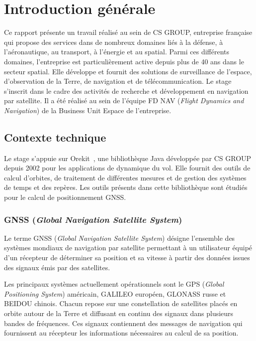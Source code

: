 \chapter*{Introduction générale}
\label{introduction}
\thispagestyle{fancy}


Ce rapport présente un travail réalisé au sein de CS GROUP, entreprise
française qui propose des services dans de nombreux domaines liés à la défense,
à l'aéronautique, au transport, à l'énergie et au spatial.
Parmi ces différents domaines, l'entreprise est particulièrement active depuis
plus de 40 ans dans le secteur spatial. Elle développe et fournit des
solutions de surveillance de l'espace, d'observation de la Terre, de navigation
et de télécommunication.
Le stage s'inscrit dans le cadre des activités de recherche et développement en
navigation par satellite. Il a été réalisé au sein de l'équipe FD NAV
(\emph{Flight Dynamics and Navigation}) de la Business Unit Espace de
l'entreprise.


\section{Contexte technique}

Le stage s'appuie sur Orekit~\cite{orekitWebsite}, une bibliothèque Java développée par CS GROUP
depuis 2002 pour les applications de dynamique du vol. Elle fournit
des outils de calcul d'orbites, de traitement de différentes mesures et de gestion des systèmes de temps et des repères.
Les outils présents dans cette bibliothèque sont étudiés pour le calcul de positionnement GNSS.

\subsection{GNSS (\textit{Global Navigation Satellite System})}

Le terme GNSS (\textit{Global Navigation Satellite System}) désigne l'ensemble des systèmes mondiaux de navigation par satellite permettant à un utilisateur équipé d'un récepteur de déterminer sa position et sa vitesse à partir des données issues des signaux émis par des satellites.

Les principaux systèmes actuellement opérationnels sont le GPS
(\textit{Global Positioning System}) américain, GALILEO européen, GLONASS russe
et BEIDOU chinois. Chacun repose sur une constellation de satellites placés en
orbite autour de la Terre et diffusant en continu des signaux dans
plusieurs bandes de fréquences. Ces signaux contiennent des messages de
navigation qui fournissent au récepteur les informations nécessaires au calcul
de sa position.


